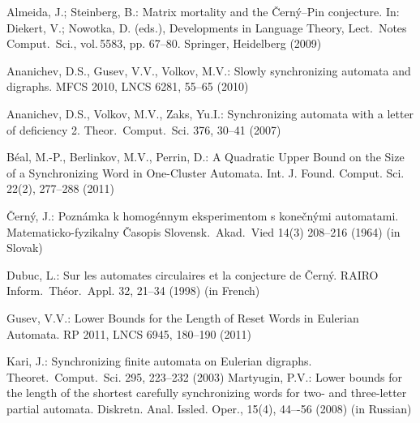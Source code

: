 \documentclass[11pt]{llncs}
\begin{document}
\begin{thebibliography}{99}
Almeida, J.; Steinberg, B.: Matrix mortality and the \v{C}ern\'{y}--Pin
conjecture. In:  Diekert, V.; Nowotka, D. (eds.), Developments in
Language Theory, Lect.\ Notes Comput.\ Sci., vol.\,5583, pp. 67--80.
Springer, Heidelberg (2009)
%

Ananichev, D.S., Gusev, V.V., Volkov, M.V.: Slowly synchronizing automata and
digraphs. MFCS 2010, LNCS 6281,  55--65 (2010)

Ananichev, D.S., Volkov, M.V., Zaks, Yu.I.: Synchronizing automata
with a letter of deficiency 2. Theor.\ Comput.\ Sci. 376, 30--41 (2007)

B\'{e}al, M.-P., Berlinkov, M.V., Perrin, D.: A Quadratic Upper Bound on the Size of a Synchronizing Word 
in One-Cluster Automata. Int. J. Found. Comput. Sci. 22(2), 277--288 (2011)

\v{C}ern\'{y}, J.: Pozn\'{a}mka k homog\'{e}nnym eksperimentom s
kone\v{c}n\'{y}mi automatami. Matematicko-fyzikalny \v{C}asopis
Slovensk.\ Akad.\ Vied 14(3) 208--216 (1964) (in Slovak)

Dubuc, L.: Sur les automates circulaires et la conjecture de
\v{C}ern\'y. RAIRO Inform.\ Th\'eor.\ Appl. 32, 21--34 (1998) (in
French)
%
%
%
%

Gusev, V.V.: Lower Bounds for the Length of Reset Words in Eulerian Automata. RP 2011,
LNCS 6945, 180--190 (2011)

Kari, J.: Synchronizing finite automata on Eulerian digraphs.
Theoret.\ Comput.\ Sci. 295, 223--232 (2003)
%
Martyugin, P.V.: Lower bounds for the length of the shortest carefully synchronizing 
words for two- and three-letter partial automata. Diskretn. Anal. Issled. Oper., 15(4), 44–-56 (2008)
(in Russian)


\end{thebibliography}
\end{document}

